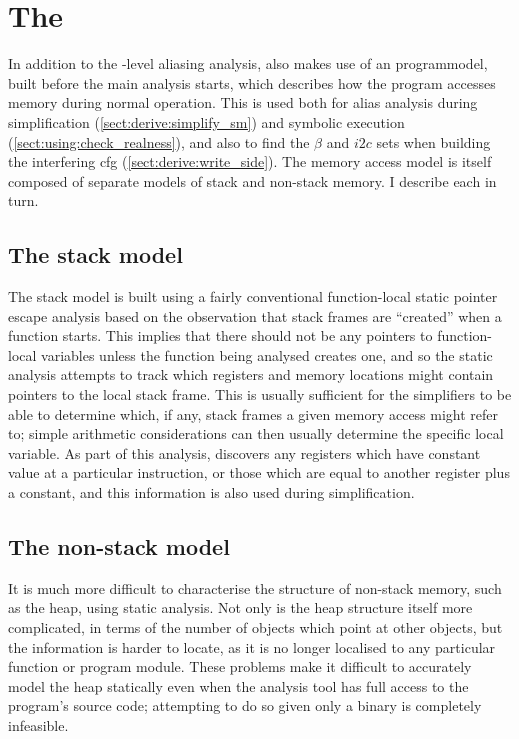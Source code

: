 \section{The }
\label{sect:program_model}

In addition to the {\StateMachine}-level aliasing analysis,
{\technique} also makes use of an \gls{programmodel}, built before the
main analysis starts, which describes how the program accesses memory
during normal operation.  This is used both for alias analysis during
{\StateMachine} simplification (\autoref{sect:derive:simplify_sm}) and
symbolic execution (\autoref{sect:using:check_realness}), and also to
find the $\beta$ and $i2c$ sets when building the interfering
\gls{cfg} (\autoref{sect:derive:write_side}).  The memory access model
is itself composed of separate models of stack and non-stack memory.
I describe each in turn.

\subsection{The stack model}
The stack model is built using a fairly conventional function-local
static pointer escape analysis\needCite{} based on the observation
that stack frames are ``created'' when a function starts.  This
implies that there should not be any pointers to function-local
variables unless the function being analysed creates one, and so the
static analysis attempts to track which registers and memory locations
might contain pointers to the local stack frame.  This is usually
sufficient for the {\StateMachine} simplifiers to be able to determine
which, if any, stack frames a given memory access might refer to;
simple arithmetic considerations can then usually determine the
specific local variable.  As part of this analysis, {\technique}
discovers any registers which have constant value at a particular
instruction, or those which are equal to another register plus a
constant, and this information is also used during {\StateMachine}
simplification.

\subsection{The non-stack model}
It is much more difficult to characterise the structure of non-stack
memory, such as the heap, using static analysis.  Not only is the heap
structure itself more complicated, in terms of the number of objects
which point at other objects, but the information is harder to locate,
as it is no longer localised to any particular function or program
module.  These problems make it difficult to accurately model the heap
statically even when the analysis tool has full access to the
program's source code\needCite{}; attempting to do so given only a
binary is completely infeasible.

